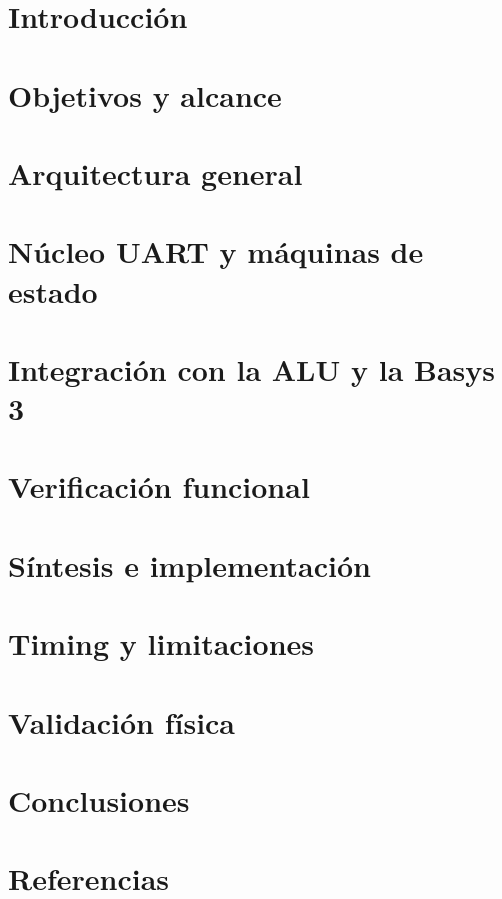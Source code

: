 \documentclass[12pt,a4paper,openany]{book}
\begin{document}

\begingroup
\pagestyle{plain}
\tableofcontents
\thispagestyle{plain}
\endgroup
\newpage

\chapter{Introducción}\label{chap:introduccion}


\chapter{Objetivos y alcance}


\chapter{Arquitectura general}


\chapter{Núcleo UART y máquinas de estado}\label{chap:nucleo-uart}



\chapter{Integración con la ALU y la Basys 3}


\chapter{Verificación funcional}\label{chap:verificacion}


\chapter{Síntesis e implementación}


\chapter{Timing y limitaciones}


\chapter{Validación física}\label{chap:validacion}


\chapter{Conclusiones}
\begingroup
\setlength{\parskip}{0.30em}

\endgroup

\chapter*{Referencias}

\end{document}
